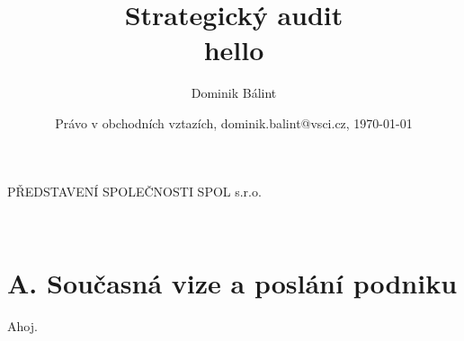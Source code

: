 \documentclass{article}
\author{Dominik Bálint}
\date{Právo v obchodních vztazích, dominik.balint@vsci.cz, \today}
\title{\textbf{\Huge Strategický audit\\}hello}
\begin{document}
\maketitle
\thispagestyle{fancy}
	
\begin{lefttextpipe}
	{\huge PŘEDSTAVENÍ SPOLEČNOSTI SPOL s.r.o.}
\end{lefttextpipe}

\lipsum[1]\\

\lipsum[1]

\section*{A. Současná vize a poslání podniku}

\newpage

Ahoj.
	
\end{document}
